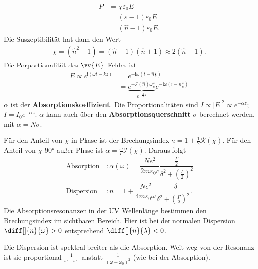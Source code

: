 \documentclass[a4paper,12pt]{article}
\numberwithin{equation}{section}
\begin{document}
\begin{align} 
        P&=\chi \varepsilon _0E\\
         &=\left(\varepsilon -1\right)\varepsilon _0E\\
         &=\left(\hat{n}-1\right)\varepsilon _0E
.\end{align} 
Die Suszeptibilität hat dann den Wert
\begin{align} 
        \chi=\left(\hat{n}^2-1\right)=\left(\hat{n}-1\right)\left(\hat{n}+1\right)\approx 2\left(\hat{n}-1\right)
.\end{align} 
Die Porportionalität des $\vv{E}$--Feldes ist
\begin{align} 
        E\propto e^{\text{i}\left(\omega t-kz\right)}&=e^{-\text{i}\omega \left(t-\hat{n}\tfrac{z}{c}\right)}\\
                                                     &=\underbrace{e^{-\mathcal{I}\left(\hat{n}\right)\omega \tfrac{z}{c} }}_{e^{-\tfrac{\alpha }{2}z}}e^{-\text{i}\omega \left(t-n \tfrac{z}{c}\right)}
\end{align} 
$\alpha $ ist der \textbf{Absorptionskoeffizient}. Die Proportionalitäten sind $I\propto |E|^2\propto e^{-\alpha z}$; $I=I_0e^{-\alpha z}$. $\alpha $ kann auch über den \textbf{Absorptionsquerschnitt} $\sigma $ berechnet werden, mit $\alpha =N\sigma $.\par
Für den Anteil von $\chi$ in Phase ist der Brechungsindex $n=1+\tfrac{1}{2}\mathcal{R}\left(\chi\right)$. Für den Anteil von $\chi$ $\ang{90}$ außer Phase ist $\alpha =\tfrac{\omega }{c}\mathcal{I}\left(\chi\right)$. Daraus folgt
\begin{align} 
        \,\text{Absorption}\,&:\alpha \left(\omega \right)=\dfrac{Ne^2}{2m\varepsilon _0c}\dfrac{\tfrac{\Gamma }{2}}{\delta ^2+\left(\tfrac{\Gamma }{2}\right)^2}\\
        \,\text{Dispersion}\,&:n=1+\dfrac{Ne^2}{4m\varepsilon _0\omega }\dfrac{-\delta }{\delta ^2+\left(\tfrac{\Gamma }{2}\right)^2}
.\end{align} 
Die Absorptionsresonanzen in der UV Wellenlänge bestimmen den Brechungsindex im sichtbaren Bereich. Hier ist bei der normalen Dispersion $\diff[]{n}{\omega }>0$ entsprechend $\diff[]{n}{\lambda }<0$.\par
Die Dispersion ist spektral breiter als die Absorption. Weit weg von der Resonanz ist sie proportional $\tfrac{1}{\omega -\omega _0}$ anstatt $\tfrac{1}{\left(\omega -\omega _0\right)^2}$ (wie bei der Absorption).
\end{document}
